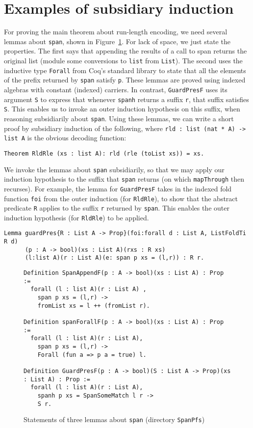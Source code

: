 \documentclass[a4paper,USenglish]{lipics-v2021}
\begin{document}
\section{Examples of subsidiary induction}
\label{sec:examplesi}

For proving the main theorem about run-length encoding, we need
several lemmas about \verb|span|, shown in Figure~\ref{fig:spanlem}.
For lack of space, we just state the properties.  The first says that
appending the results of a call to span returns the original list
(module some conversions to \verb|list| from \verb|List|).  The second
uses the inductive type \verb|Forall| from Coq's standard library to
state that all the elements of the prefix returned by \verb|span|
satisfy \verb|p|.  These lemmas are proved using indexed algebras with
constant (indexed) carriers.  In contrast, \verb|GuardPresF| uses its
argument \verb|S| to express that whenever \verb|spanh| returns a
suffix \verb|r|, that suffix satisfies \verb|S|.  This enables us to
invoke an outer induction hypothesis on this suffix, when reasoning
subsidiarily about \verb|span|.  Using these lemmas, we can write a
short proof by subsidiary induction of the following, where
\verb|rld : list (nat * A) -> list A| is the obvious decoding
function:

\begin{verbatim}
Theorem RldRle (xs : list A): rld (rle (toList xs)) = xs.
\end{verbatim}

\noindent We invoke the lemmas about \verb|span| subsidiarily,
so that we may apply our induction hypothesis to the suffix
that \verb|span| returns (on which \verb|mapThrough| then recurses).
For example, the lemma for \verb|GuardPresF| takes in the
indexed fold function \verb|foi| from the outer induction (for \verb|RldRle|),
to show that the abstract predicate \verb|R| applies to the suffix
\verb|r| returned by \verb|span|.  This enables the outer induction
hypothesis (for \verb|RldRle|) to be applied.

\begin{verbatim}
Lemma guardPres{R : List A -> Prop}(foi:forall d : List A, ListFoldTi R d)
      (p : A -> bool)(xs : List A)(rxs : R xs)
      (l:list A)(r : List A)(e: span p xs = (l,r)) : R r.
\end{verbatim}

\begin{figure}
\begin{verbatim}
Definition SpanAppendF(p : A -> bool)(xs : List A) : Prop :=
  forall (l : list A)(r : List A) ,
    span p xs = (l,r) ->
    fromList xs = l ++ (fromList r).

Definition spanForallF(p : A -> bool)(xs : List A) : Prop :=
  forall (l : list A)(r : List A),
    span p xs = (l,r) ->
    Forall (fun a => p a = true) l.

Definition GuardPresF(p : A -> bool)(S : List A -> Prop)(xs : List A) : Prop :=
  forall (l : list A)(r : List A),
    spanh p xs = SpanSomeMatch l r ->
    S r.
\end{verbatim}
\caption{Statements of three lemmas about \texttt{span} (directory \texttt{SpanPfs})}
\label{fig:spanlem}
\end{figure}
\end{document}
